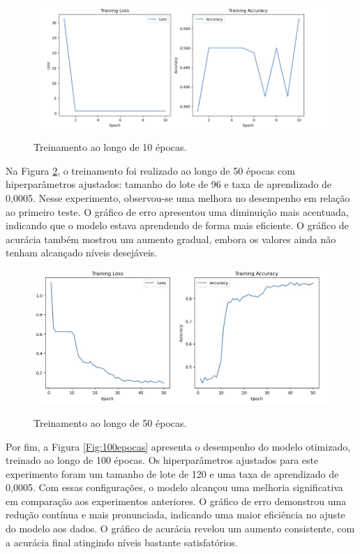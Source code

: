\begin{figure}[!h]
	\centering
	\caption{Treinamento ao longo de 10 épocas.}
	\includegraphics[width=15cm]{figuras/10 epocas.png}\\
	\label{Fig:10epocas}
\end{figure}

Na Figura \ref{Fig:50epocas}, o treinamento foi realizado ao longo de 50 épocas com hiperparâmetros ajustados: tamanho do lote de 96 e taxa de aprendizado de 0,0005. Nesse experimento, observou-se uma melhora no desempenho em relação ao primeiro teste. O gráfico de erro apresentou uma diminuição mais acentuada, indicando que o modelo estava aprendendo de forma mais eficiente. O gráfico de acurácia também mostrou um aumento gradual, embora os valores ainda não tenham alcançado níveis desejáveis.

\begin{figure}[!h]
	\centering
	\caption{Treinamento ao longo de 50 épocas.}
	\includegraphics[width=14.4cm]{figuras/50 epocas.png}\\
	\label{Fig:50epocas}
\end{figure}

Por fim, a Figura \ref{Fig:100epocas} apresenta o desempenho do modelo otimizado, treinado ao longo de 100 épocas. Os hiperparâmetros ajustados para este experimento foram um tamanho de lote de 120 e uma taxa de aprendizado de 0,0005. Com essas configurações, o modelo alcançou uma melhoria significativa em comparação aos experimentos anteriores. O gráfico de erro demonstrou uma redução contínua e mais pronunciada, indicando uma maior eficiência no ajuste do modelo aos dados. O gráfico de acurácia revelou um aumento consistente, com a acurácia final atingindo níveis bastante satisfatórios.


